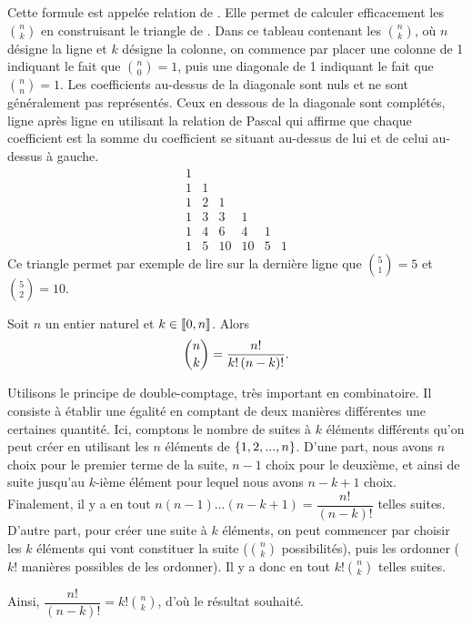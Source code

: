 \documentclass{magnoliaold}
\begin{document}
\begin{remarqueUnique}
\remarque Cette formule est appelée relation de . Elle permet de calculer
  efficacement les $\binom{n}{k}$ en construisant le triangle de . Dans ce
  tableau contenant les $\binom{n}{k}$, où $n$ désigne la ligne et $k$ désigne la colonne,
  on commence par placer une colonne de 1 indiquant le fait que $\binom{n}{0}=1$, puis une diagonale
  de 1 indiquant le fait que $\binom{n}{n}=1$. Les coefficients au-dessus de la diagonale sont nuls
  et ne sont généralement pas représentés. Ceux en dessous de la diagonale sont complétés, ligne
  après ligne en utilisant la relation de Pascal qui affirme que chaque coefficient est la somme
  du coefficient se situant au-dessus de lui et de celui au-dessus à gauche.
  \[\begin{matrix}
    1 &   &    &    &   &  \\
    1 & 1 &    &    &   &  \\
    1 & 2 &  1 &    &   &  \\
    1 & 3 &  3 &  1 &   &  \\
    1 & 4 &  6 &  4 & 1 &  \\
    1 & 5 & 10 & 10 & 5 & 1
    \end{matrix}\]
  Ce triangle permet par exemple de lire sur la dernière ligne que $\binom{5}{1}=5$ et $\binom{5}{2}=10$.
\end{remarqueUnique}

\begin{proposition}[utile=-3]
Soit $n$ un entier naturel et $k\in\left\llbracket 0,n\right\rrbracket$. Alors
\[\binom{n}{k}=\frac{n!}{k!\left(n-k\right)!}.\]
\end{proposition}

\begin{preuve}
Utilisons  le  principe  de double-comptage, très  important  en  combinatoire.  Il consiste à établir une égalité en comptant de deux manières différentes une certaines quantité. Ici, comptons le nombre de suites à $k$ éléments différents qu'on peut créer en utilisant les $n$ éléments de $\left\{1, 2, . . . ,n\right\}$. D'une part, nous avons $n$ choix pour le premier terme de la suite, $n-1$ choix pour le deuxième, et ainsi de suite jusqu'au $k$-ième élément pour lequel nous avons $n-k+1$ choix. Finalement, il y a en tout $n(n-1)\ldots(n-k+1) =\dfrac{n!}{(n-k)!}$ telles suites. D'autre part, pour créer une suite à $k$ éléments, on peut commencer par choisir les $k$ éléments qui vont constituer la suite ($\binom{n}{k}$ possibilités), puis les ordonner ($k!$ manières possibles de les ordonner). Il y a donc en tout $k!\binom{n}{k}$ telles suites.

Ainsi, $\dfrac{n!}{(n-k)!}=k!\binom{n}{k}$, d'où le résultat souhaité.

\end{preuve}
\end{document}
